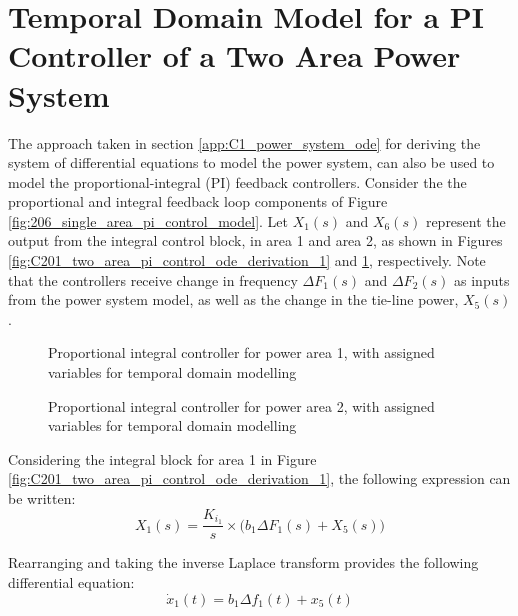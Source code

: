 \section{Temporal Domain Model for a PI Controller of a Two Area Power System} \label{sec:temporal_domain_for_pi_controller}

The approach taken in section \ref{app:C1_power_system_ode} for deriving the system of differential equations to model the power system, can also be used to model the proportional-integral (PI) feedback controllers. Consider the the proportional and integral feedback loop components of Figure \ref{fig:206_single_area_pi_control_model}. Let $X_1(s)$ and $X_6(s)$ represent the output from the integral control block, in area 1 and area 2, as shown in Figures \ref{fig:C201_two_area_pi_control_ode_derivation_1} and \ref{fig:C202_two_area_pi_control_ode_derivation_2}, respectively. Note that the controllers receive change in frequency $\Delta F_1(s)$ and $\Delta F_2(s)$ as inputs from the power system model, as well as the change in the tie-line power, $X_5(s)$.

\begin{figure}[h]
	\begin{minipage}[b]{0.5\textwidth}
		\resizebox{7.0cm}{!}{}
		\caption{Proportional integral controller for power area 1, with assigned variables for temporal domain modelling}
		\label{fig:C201_two_area_pi_control_ode_derivation_1}
	\end{minipage}
	\hspace{0.1cm}
	\begin{minipage}[b]{0.5\textwidth}
		\resizebox{7.2cm}{!}{}
		\caption{Proportional integral controller for power area 2, with assigned variables for temporal domain modelling}
		\label{fig:C202_two_area_pi_control_ode_derivation_2}
	\end{minipage}
\end{figure}

Considering the integral block for area 1 in Figure \ref{fig:C201_two_area_pi_control_ode_derivation_1}, the following expression can be written:
\begin{equation}
	X_1(s) = \frac{K_{i_1}}{s} \times \big( b_1 \Delta F_1(s) + X_5(s) \big) \label{eq:C201}
\end{equation}

Rearranging and taking the inverse Laplace transform provides the following differential equation:
\begin{equation}
	\dot{x}_1(t) = b_1 \Delta f_1(t) + x_5(t) \label{eq:C202}
\end{equation}

